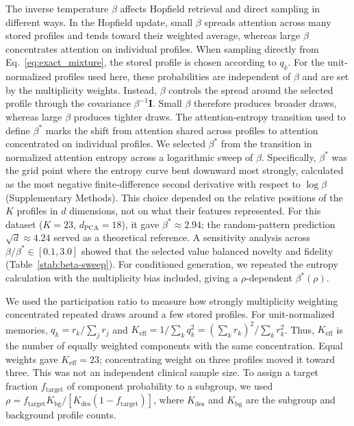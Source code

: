 The inverse temperature $\beta$ affects Hopfield retrieval and direct sampling in
different ways. In the Hopfield update, small $\beta$ spreads attention across many stored
profiles and tends toward their weighted average, whereas large $\beta$ concentrates attention on
individual profiles. When sampling directly from Eq.~\eqref{eq:exact_mixture}, the stored
profile is chosen according to $q_k$. For the unit-normalized profiles used here, these
probabilities are independent of $\beta$ and are set by the multiplicity weights. Instead,
$\beta$ controls the spread around the selected profile through the covariance
$\beta^{-1}\mathbf{I}$. Small $\beta$ therefore produces broader draws, whereas large $\beta$
produces tighter draws. The attention-entropy transition used to define $\beta^*$ marks the
shift from attention shared across profiles to attention concentrated on individual profiles.
We selected $\beta^*$ from the transition in normalized attention entropy across a
logarithmic sweep of $\beta$. Specifically, $\beta^*$ was the grid point where the entropy
curve bent downward most strongly, calculated as the most negative finite-difference second
derivative with respect to $\log\beta$ (Supplementary Methods). This choice depended on the
relative positions of the $K$ profiles in $d$ dimensions, not on what their features
represented. For this dataset
($K{=}23$, $d_{\text{PCA}}{=}18$), it gave $\beta^*\approx2.94$; the random-pattern prediction
$\sqrt{d}\approx4.24$ served as a theoretical reference. A sensitivity analysis across
$\beta/\beta^*\in[0.1,3.0]$ showed that the selected value balanced novelty and
fidelity (Table~\ref{stab:beta-sweep}). For conditioned generation, we repeated the entropy
calculation with the multiplicity bias included, giving a $\rho$-dependent $\beta^*(\rho)$.

We used the participation ratio to measure how strongly multiplicity weighting
concentrated repeated draws around a few stored profiles. For unit-normalized memories,
$q_k=r_k/\sum_j r_j$ and
$K_{\text{eff}}=1/\sum_k q_k^2=(\sum_k r_k)^2/\sum_k r_k^2$. Thus,
$K_{\text{eff}}$ is the number of equally weighted components with the same concentration.
Equal weights gave $K_{\text{eff}}=23$; concentrating weight on three profiles moved it toward
three. This was not an independent clinical sample size. To assign a target fraction
$f_{\text{target}}$ of component probability to a subgroup, we used
$\rho=f_{\text{target}}K_{\text{bg}}/[K_{\text{des}}(1-f_{\text{target}})]$, where
$K_{\text{des}}$ and $K_{\text{bg}}$ are the subgroup and background profile counts.



